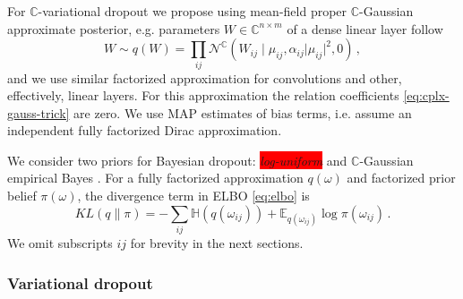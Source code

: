 \documentclass[a4paper,10pt]{article}
\newcommand{\cplx}{\mathbb{C}}
\newcommand{\verify}[1]{\textit{\!\colorbox{red}{#1}\!}}
\begin{document}
For $\cplx$-variational dropout we propose using mean-field proper $\cplx$-Gaussian approximate
posterior, e.g. parameters $W \in \cplx^{n\times m}$ of a dense linear layer follow
\begin{equation}  \label{eq:c-gauss-vi}
  W \sim q(W)
    = \prod_{ij} \mathcal{N}^{\cplx}(
      W_{ij} \mid
        \mu_{ij},
        \alpha_{ij} \lvert \mu_{ij} \rvert^2,
        0
    )
  \,,
\end{equation}
and we use similar factorized approximation for convolutions and other, effectively, linear
layers. For this approximation the relation coefficients \eqref{eq:cplx-gauss-trick} are
zero. We use MAP estimates of bias terms, i.e. assume an independent fully factorized Dirac
approximation.

We consider two priors for Bayesian dropout: \verify{log-uniform} and $\cplx$-Gaussian empirical
Bayes \citep{kingma_variational_2015,molchanov_variational_2017,kharitonov_variational_2018}.
For a fully factorized approximation $q(\omega)$ and factorized prior belief $\pi(\omega)$,
the divergence term in ELBO \eqref{eq:elbo} is
\begin{equation}  \label{eq:elbo-general-kl-div}
  KL(q \| \pi)
    = - \sum_{ij}
        \mathbb{H}(q(\omega_{ij}))
        + \mathbb{E}_{q(\omega_{ij})} \log{\pi(\omega_{ij})}
    \,.
\end{equation}
We omit subscripts ${ij}$ for brevity in the next sections.

\subsubsection{Variational dropout} %
\label{ssub:variational_dropout}
\end{document}
